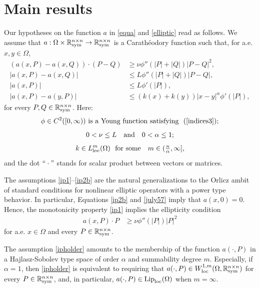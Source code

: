 \documentclass[leqno,11pt]{amsart}%
\numberwithin{equation}{section}
\def\real{\mathbb R}
\def\Sym{\real^{n\times n}_{\textup{sym}}}
\theoremstyle{definition}
\numberwithin{equation}{section}
\begin{document}
\section{Main results}\label{sec:main}

  
Our hypotheses on the  function $a$   in \eqref{equa} and \eqref{elliptic} read as follows.
 We assume 
that $a:\Omega\times\Sym\to\Sym$ is a Carath\'eodory function such that, for a.e. $x,y\in\Omega$, 
\begin{align}
   \label{ip1}
 (   a(x,P)-a(x,Q))\cdot (P-Q)
  &\ge \nu\phi''(|P|+|Q|)|P-Q|^2,\\
  \label{ip2}
  |a(x,P)-a(x,Q)|&\le L\phi''(|P|+|Q|)|P-Q|,\\
    \label{ip2b}
   |a(x,P)|&\le L\phi'(|P|),\\
  \label{ipholder}
  |a(x,P)-a(y,P)|
  &\le
  (k(x)+k(y))|x-y|^\alpha \phi'(|P|),
 \end{align}
  for every $P,Q\in\Sym$. 
Here:
\begin{equation}\label{hpphi}
    \phi \in C^2([0, \infty))\,\, 
   \text{is a Young function satisfying \,\,(\ref{indices3});}
\end{equation} 
\begin{align}
    \label{hppar}
    \text{$0<\nu\le L$ \,\, and  \,\, $0<\alpha\le 1$;}
\end{align}
\begin{align}\label{hpk}
    \text{$k\in L^m_{\rm loc}(\Omega)$\,\,
for some \,\, $m\in (\tfrac n\alpha, \infty]$,}
\end{align} 
and the dot $\lq\lq \cdot "$ stands for scalar product between vectors or matrices.
 
The assumptions \eqref{ip1}--\eqref{ip2b} are the natural generalizations to the Orlicz ambit of standard conditions for nonlinear  elliptic operators with a power type behavior. 
In particular, Equations \eqref{ip2b} and \eqref{july57} imply that $a(x,0)=0$. Hence, the monotonicity property \eqref{ip1} implies the ellipticity condition
\begin{align}
    \label{july58}
    a(x,P) \cdot P
  &\ge \nu\phi''(|P|)|P|^2
\end{align}
for a.e. $x\in \Omega$ and  every $P\in\Sym$.

 
The assumption \eqref{ipholder}
amounts to the membership of the function $a(\cdot, P)$ in a Hajlasz-Sobolev type space of  order $\alpha$ and summability degree $m$. Especially, if $\alpha=1$, then \eqref{ipholder} is equivalent to requiring that $a(\cdot, P)\in W^{1,m}_{\rm loc}(\Omega, \Sym)$ for every $P\in \Sym$, and, in particular, 
$a(\cdot, P)\in {\rm Lip}_{\rm loc}(\Omega)$ when $m=\infty$.
\end{document}
